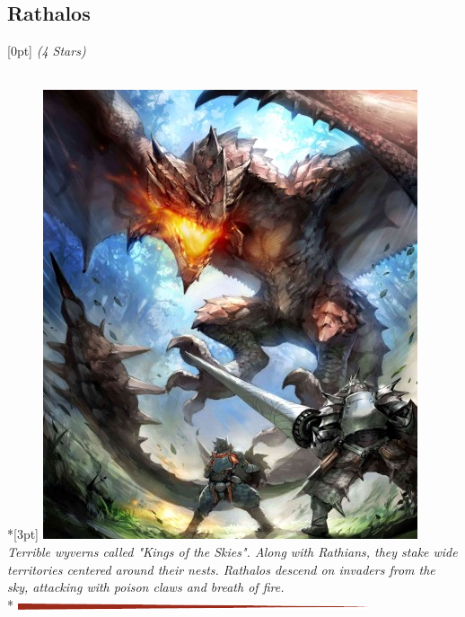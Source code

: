 \begin{hbMonsterNote}[t]
\begin{minipage}{\dimexpr -4pt-1cm+\linewidth}
\subsection*{Rathalos}%
\raisebox{-2pt}[0pt]{\FiveStar\FiveStar\FiveStar\FiveStar\FiveStarOpen\FiveStarOpen\FiveStarOpen\FiveStarOpen\FiveStarOpen\FiveStarOpen} \textit{(4 Stars)}%
\end{minipage}\\*[3pt]
\includegraphics[width=\linewidth]{assets/ext/rathalos-cover.jpg}
\hbSBSep{}%
\textit{Terrible wyverns called "Kings of the Skies". Along with Rathians, they stake wide territories centered around their nests. Rathalos descend on invaders from the sky, attacking with poison claws and breath of fire.}\\*
\noindent\includegraphics[height=5pt,width=\linewidth]{assets/stat-block-separator}\par

\end{hbMonsterNote}
